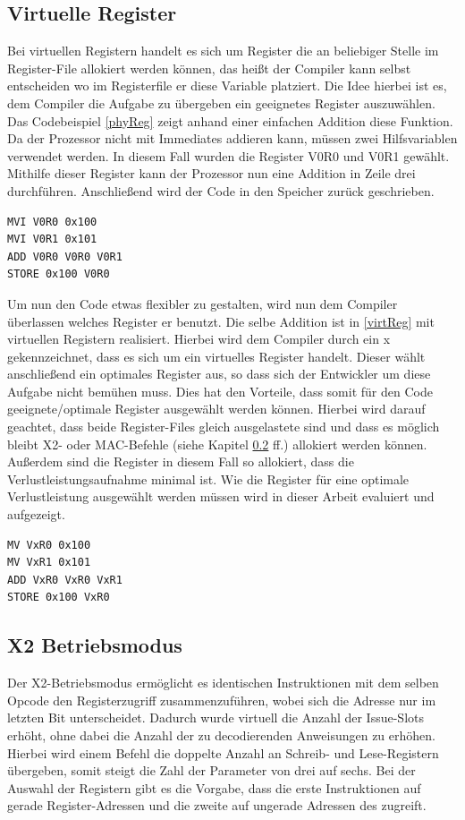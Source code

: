 \subsection{Virtuelle Register}
\label{sub:virtuelleR}
Bei virtuellen Registern handelt es sich um Register die an beliebiger Stelle im Register-File allokiert werden können, das heißt der Compiler kann selbst entscheiden wo im Registerfile er diese Variable platziert. 
Die Idee hierbei ist es, dem Compiler die Aufgabe zu übergeben ein geeignetes Register auszuwählen. Das Codebeispiel \ref{phyReg} zeigt anhand einer einfachen Addition diese Funktion. Da der Prozessor nicht mit Immediates addieren kann, müssen zwei Hilfsvariablen verwendet werden. In diesem Fall wurden die Register V0R0 und V0R1 gewählt. Mithilfe dieser Register kann der Prozessor nun eine Addition in Zeile drei durchführen. Anschließend wird der Code in den Speicher zurück geschrieben.
\newpage
\renewcommand{\lstlistingname}{Codebeispiel}
\begin{lstlisting}[frame=single, caption={physikalische Register},captionpos=b,label=phyReg]
MVI V0R0 0x100
MVI V0R1 0x101
ADD V0R0 V0R0 V0R1
STORE 0x100 V0R0
\end{lstlisting}
Um nun den Code etwas flexibler zu gestalten, wird  nun dem Compiler überlassen welches Register er benutzt. Die selbe Addition ist in \ref{virtReg} mit virtuellen Registern realisiert. Hierbei wird dem Compiler durch ein x gekennzeichnet, dass es sich um ein virtuelles Register handelt. Dieser wählt anschließend ein optimales Register aus, so dass sich der Entwickler um diese Aufgabe nicht bemühen muss. Dies hat den Vorteile, dass somit für den Code geeignete/optimale Register ausgewählt werden können. Hierbei wird darauf geachtet, dass beide Register-Files gleich ausgelastete sind und dass es möglich bleibt X2- oder MAC-Befehle (siehe Kapitel \ref{subsec:x2Mode} ff.) allokiert werden können. Außerdem sind die Register in diesem Fall so allokiert, dass die Verlustleistungsaufnahme minimal ist. Wie die Register für eine optimale Verlustleistung ausgewählt werden müssen wird in dieser Arbeit evaluiert und aufgezeigt.

\begin{lstlisting}[frame=single,caption={virtuelle Register},captionpos=b,label=virtReg]
MV VxR0 0x100
MV VxR1 0x101
ADD VxR0 VxR0 VxR1
STORE 0x100 VxR0
\end{lstlisting}
\subsection{X2 Betriebsmodus}\label{subsec:x2Mode}
Der X2-Betriebsmodus ermöglicht es identischen Instruktionen mit dem selben Opcode den Registerzugriff zusammenzuführen, wobei sich die Adresse nur im letzten Bit unterscheidet. Dadurch wurde virtuell die Anzahl der Issue-Slots erhöht, ohne dabei die Anzahl der zu decodierenden Anweisungen zu erhöhen. Hierbei wird einem Befehl die doppelte Anzahl an Schreib- und Lese-Registern übergeben, somit steigt die Zahl der Parameter von drei auf sechs. Bei der Auswahl der Registern gibt es die Vorgabe, dass die erste Instruktionen auf gerade Register-Adressen und die zweite auf ungerade Adressen des zugreift. \cite{paya2009instruction}
